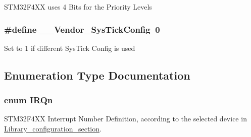 S\-T\-M32\-F4\-X\-X uses 4 Bits for the Priority Levels \hypertarget{group___configuration__section__for___c_m_s_i_s_gab58771b4ec03f9bdddc84770f7c95c68}{
\subsubsection[{\-\_\-\-\_\-\-Vendor\-\_\-\-Sys\-Tick\-Config}]{\setlength{\rightskip}{0pt plus 5cm}\#define \-\_\-\-\_\-\-Vendor\-\_\-\-Sys\-Tick\-Config~0}}\label{group___configuration__section__for___c_m_s_i_s_gab58771b4ec03f9bdddc84770f7c95c68}
Set to 1 if different Sys\-Tick Config is used 

\subsection{Enumeration Type Documentation}
\hypertarget{group___configuration__section__for___c_m_s_i_s_ga666eb0caeb12ec0e281415592ae89083}{
\subsubsection[{I\-R\-Qn}]{\setlength{\rightskip}{0pt plus 5cm}enum {\bf I\-R\-Qn}}}\label{group___configuration__section__for___c_m_s_i_s_ga666eb0caeb12ec0e281415592ae89083}


S\-T\-M32\-F4\-X\-X Interrupt Number Definition, according to the selected device in \hyperlink{group___library__configuration__section}{Library\-\_\-configuration\-\_\-section}. 

